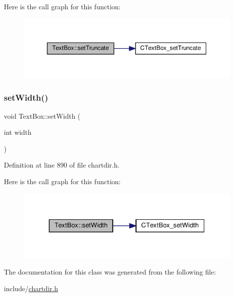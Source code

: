 Here is the call graph for this function\+:
\nopagebreak
\begin{figure}[H]
\begin{center}
\leavevmode
\includegraphics[width=345pt]{class_text_box_a71d706a7ad9cda1093c03090e14563e9_cgraph}
\end{center}
\end{figure}
\mbox{\label{class_text_box_a05bc472408f11199e79490193553f6ad}} 
\subsubsection{\texorpdfstring{set\+Width()}{setWidth()}}
{\footnotesize\ttfamily void Text\+Box\+::set\+Width (\begin{DoxyParamCaption}\item[{int}]{width }\end{DoxyParamCaption})\hspace{0.3cm}{\ttfamily [inline]}}



Definition at line 890 of file chartdir.\+h.

Here is the call graph for this function\+:
\nopagebreak
\begin{figure}[H]
\begin{center}
\leavevmode
\includegraphics[width=319pt]{class_text_box_a05bc472408f11199e79490193553f6ad_cgraph}
\end{center}
\end{figure}


The documentation for this class was generated from the following file\+:\begin{DoxyCompactItemize}
\item 
include/\hyperlink{chartdir_8h}{chartdir.\+h}\end{DoxyCompactItemize}
